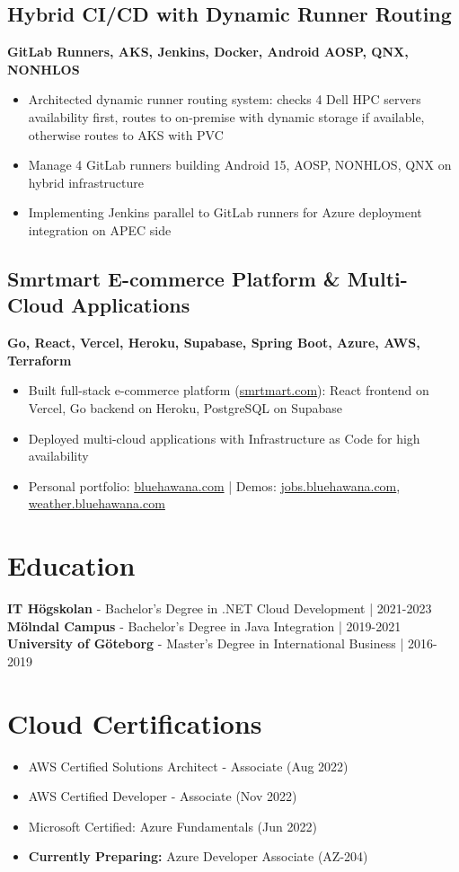 \documentclass[11pt,a4paper]{article}
\begin{document}
\subsection{Hybrid CI/CD with Dynamic Runner Routing}
\textbf{GitLab Runners, AKS, Jenkins, Docker, Android AOSP, QNX, NONHLOS}
\begin{itemize}[noitemsep]
\item Architected dynamic runner routing system: checks 4 Dell HPC servers availability first, routes to on-premise with dynamic storage if available, otherwise routes to AKS with PVC
\item Manage 4 GitLab runners building Android 15, AOSP, NONHLOS, QNX on hybrid infrastructure
\item Implementing Jenkins parallel to GitLab runners for Azure deployment integration on APEC side
\end{itemize}

\subsection{Smrtmart E-commerce Platform \& Multi-Cloud Applications}
\textbf{Go, React, Vercel, Heroku, Supabase, Spring Boot, Azure, AWS, Terraform}
\begin{itemize}[noitemsep]
\item Built full-stack e-commerce platform (\href{https://smrtmart.com}{smrtmart.com}): React frontend on Vercel, Go backend on Heroku, PostgreSQL on Supabase
\item Deployed multi-cloud applications with Infrastructure as Code for high availability
\item Personal portfolio: \href{https://www.bluehawana.com}{bluehawana.com} | Demos: \href{https://jobs.bluehawana.com}{jobs.bluehawana.com}, \href{https://weather.bluehawana.com}{weather.bluehawana.com}
\end{itemize}

\section*{Education}
\textbf{IT Högskolan} - Bachelor's Degree in .NET Cloud Development | 2021-2023\\
\textbf{Mölndal Campus} - Bachelor's Degree in Java Integration | 2019-2021\\
\textbf{University of Göteborg} - Master's Degree in International Business | 2016-2019

\section*{Cloud Certifications}
\begin{itemize}[noitemsep]
\item AWS Certified Solutions Architect - Associate (Aug 2022)
\item AWS Certified Developer - Associate (Nov 2022)
\item Microsoft Certified: Azure Fundamentals (Jun 2022)
\item \textbf{Currently Preparing:} Azure Developer Associate (AZ-204)
\end{itemize}
\end{document}

